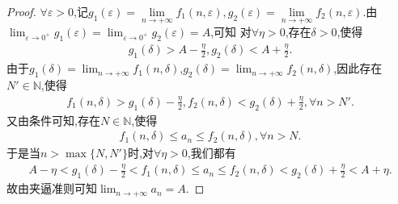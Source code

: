 \documentclass[../../main.tex]{subfiles}
\begin{document}
\begin{proof}
$\forall \varepsilon>0$,记$g_1\left( \varepsilon \right) =\underset{n\rightarrow +\infty}{\lim}f_1(n,\varepsilon ),g_2\left( \varepsilon \right) =\underset{n\rightarrow +\infty}{\lim}f_2(n,\varepsilon ).$由\(\lim_{\varepsilon \to 0^+}g_1(\varepsilon)=\lim_{\varepsilon \to 0^+}g_2(\varepsilon)=A\),可知
对\(\forall \eta > 0\),存在\(\delta > 0\),使得
\begin{align*}
g_1(\delta) > A - \frac{\eta}{2},g_2(\delta) < A + \frac{\eta}{2}.
\end{align*}
由于\(g_1(\delta)=\lim_{n \to +\infty}f_1(n,\delta)\),\(g_2(\delta)=\lim_{n \to +\infty}f_2(n,\delta)\),因此存在\(N'\in \mathbb{N}\),使得
\begin{align*}
f_1(n,\delta) > g_1(\delta) - \frac{\eta}{2},f_2(n,\delta) < g_2(\delta) + \frac{\eta}{2},\forall n > N'.
\end{align*}
又由条件可知,存在\(N\in \mathbb{N}\),使得
\begin{align*}
f_1(n,\delta) \leqslant a_n \leqslant f_2(n,\delta),\forall n > N .
\end{align*}
于是当\(n > \max\{N,N'\}\)时,对\(\forall \eta > 0\),我们都有
\begin{align*}
A - \eta < g_1(\delta) - \frac{\eta}{2} < f_1(n,\delta) \leqslant a_n \leqslant f_2(n,\delta) < g_2(\delta) + \frac{\eta}{2} < A + \eta.
\end{align*}
故由夹逼准则可知\(\lim_{n \to +\infty}a_n = A\). 
\end{proof}
\end{document}
